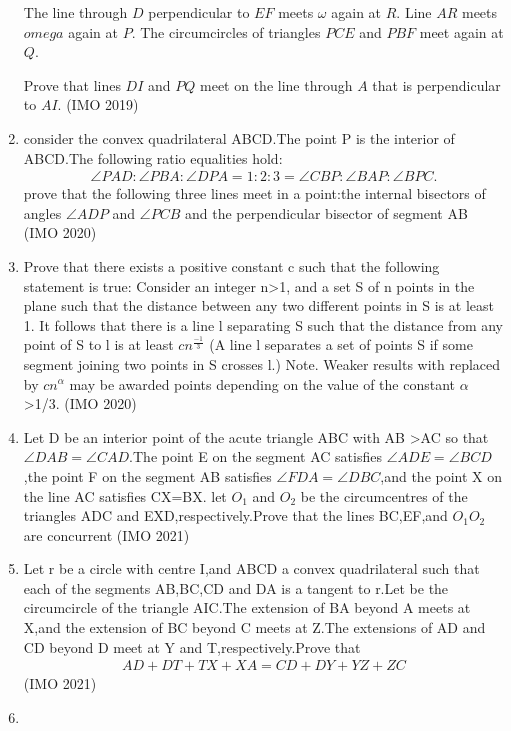 \begin{enumerate}
The line 
through $D$ perpendicular to $EF$ meets $\omega$ again at $R$. Line $AR$
 meets $omega$ again at $P$. The circumcircles of triangles $PCE$ and 
$PBF$ meet again at $Q$.

Prove that lines $DI$ and $PQ$ meet on the line through $ A$ that is perpendicular to $AI$.
\hfill(IMO 2019)
\item consider the convex quadrilateral ABCD.The point P is the interior of ABCD.The following ratio equalities hold:
\begin{align}
\angle PAD: \angle PBA: \angle DPA =1:2:3 = \angle CBP: \angle BAP: \angle BPC.
\end{align} 
prove
 that the following three lines meet in a point:the internal bisectors 
of angles $\angle ADP$ and $\angle PCB$ and the perpendicular bisector 
of segment AB
\hfill(IMO 2020)
\item Prove that there exists a positive constant c such that the following statement is true:
Consider an integer n\textgreater1, and a set S of n points in the plane such that the distance between
any
 two different points in S is at least 1. It follows that there is a 
line l separating S such that the distance from any point of S to l is 
at least $cn^\frac{-1}{3}$
(A line l separates a set of points S if some segment joining two points in S crosses l.)
Note. Weaker results with  replaced by $cn^\alpha$ may be awarded points depending on the value of the constant $ \alpha$ \textgreater1/3.
   \hfill(IMO 2020)
\item Let D be an interior point of the acute triangle ABC with AB \textgreater AC so that $\angle DAB = \angle CAD$.The point E on the segment AC satisfies $\angle ADE=\angle BCD$,the point F on the segment AB satisfies $\angle FDA=\angle DBC$,and the point X on the line AC satisfies CX=BX. let $O_{1}$ and $O_{2}$ be the circumcentres of the triangles ADC and EXD,respectively.Prove that the lines BC,EF,and $O_{1} O_{2}$ are concurrent
 \hfill(IMO 2021)
\item Let r be a circle with centre I,and ABCD a convex quadrilateral such that each of the segments AB,BC,CD and DA is a tangent to r.Let \ohm be the circumcircle of the triangle AIC.The extension of BA beyond A meets \ohm at X,and the extension of BC beyond C meets \ohm at Z.The extensions of AD and CD beyond D meet \ohm at Y and T,respectively.Prove that
\begin{align}
    AD+DT+TX+XA=CD+DY+YZ+ZC
\end{align}
 \hfill(IMO 2021)
 \item

\end{enumerate}
